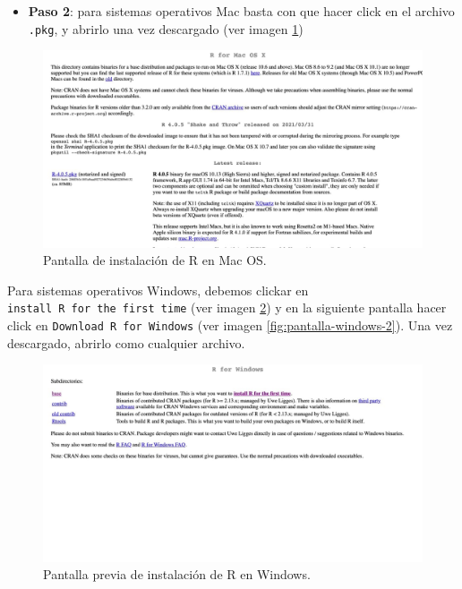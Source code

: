 \documentclass[11pt,]{book}
\providecommand{\tightlist}{%
  \setlength{\itemsep}{0pt}\setlength{\parskip}{0pt}}
\begin{document}
\begin{itemize}
\tightlist
\item
  \textbf{Paso 2}: para sistemas operativos Mac basta con que hacer click en el archivo \texttt{.pkg}, y abrirlo una vez descargado (ver imagen \ref{fig:pantalla-mac})
\end{itemize}

\begin{figure}

{\centering \includegraphics[width=0.6\linewidth]{./img/pantall_mac_cran} 

}

\caption{Pantalla de instalación de R en Mac OS.}\label{fig:pantalla-mac}
\end{figure}

Para sistemas operativos Windows, debemos clickar en \texttt{install\ R\ for\ the\ first\ time} (ver imagen \ref{fig:pantalla-windows-1}) y en la siguiente pantalla hacer click en \texttt{Download\ R\ for\ Windows} (ver imagen \ref{fig:pantalla-windows-2}). Una vez descargado, abrirlo como cualquier archivo.

\begin{figure}

{\centering \includegraphics[width=0.6\linewidth]{./img/pantalla_windows_1} 

}

\caption{Pantalla previa de instalación de R en Windows.}\label{fig:pantalla-windows-1}
\end{figure}
\end{document}

